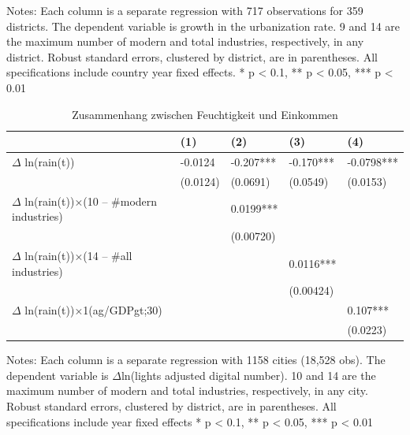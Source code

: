 \begin{table}[!hbt]
\begin{threeparttable}
    \begin{tablenotes}
       \item \small Notes: Each column is a separate regression with 717 observations for 359 districts. The   dependent variable is growth in the urbanization rate. 9 and 14 are the maximum number of modern and total industries, respectively, in any district. Robust standard errors, clustered by district, are in parentheses. All specifications include country year fixed effects. * p < 0.1, ** p < 0.05, *** p < 0.01 
    \end{tablenotes}


\end{threeparttable}
\end{table}

\hspace{0.1em}

\begin{table}[!hbt]
\caption{Zusammenhang zwischen Feuchtigkeit und Einkommen}
\label{tbl2}
\centering
\begin{threeparttable}
  \begin{tabular}{lllll} 
    \toprule
                                                    & (1)      & (2)       & (3)       & (4)         \\ 
    \midrule
    $\Delta$ ln(rain(t))                            & -0.0124  & -0.207*** & -0.170*** & -0.0798***  \\
                                                    & (0.0124) & (0.0691)  & (0.0549)  & (0.0153)    \\
    $\Delta$ ln(rain(t))×(10 – \#modern industries) & ~        & 0.0199*** & ~         & ~           \\
                                                    & ~        & (0.00720) & ~         & ~           \\
    $\Delta$ ln(rain(t))×(14 – \#all industries)    & ~        & ~         & 0.0116*** & ~           \\
                                                    & ~        & ~         & (0.00424) & ~           \\
    $\Delta$ ln(rain(t))×1(ag/GDPgt;30)             & ~        & ~         & ~         & 0.107***    \\
    ~                                               & ~        & ~         & ~         & (0.0223)    \\
    \bottomrule
  \end{tabular}
  
  \begin{tablenotes}
       \item \small Notes: Each column is a separate regression with 1158 cities (18,528 obs). The dependent variable is $\Delta$ln(lights adjusted digital number). 10 and 14 are the maximum number of modern and total industries, respectively, in any city. Robust standard errors, clustered by district, are in parentheses. All specifications include year fixed effects * p < 0.1, ** p < 0.05, *** p < 0.01 
    \end{tablenotes}

\end{threeparttable}
\end{table}


